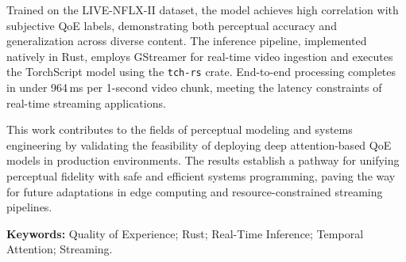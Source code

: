 Trained on the LIVE-NFLX-II dataset, the model achieves high correlation with subjective QoE labels, demonstrating both perceptual accuracy and generalization across diverse content. The inference pipeline, implemented natively in Rust, employs GStreamer for real-time video ingestion and executes the TorchScript model using the \texttt{tch-rs} crate. End-to-end processing completes in under 964\,ms per 1-second video chunk, meeting the latency constraints of real-time streaming applications.

This work contributes to the fields of perceptual modeling and systems engineering by validating the feasibility of deploying deep attention-based QoE models in production environments. The results establish a pathway for unifying perceptual fidelity with safe and efficient systems programming, paving the way for future adaptations in edge computing and resource-constrained streaming pipelines.

\textbf{Keywords:} Quality of Experience; Rust; Real-Time Inference; Temporal Attention; Streaming.